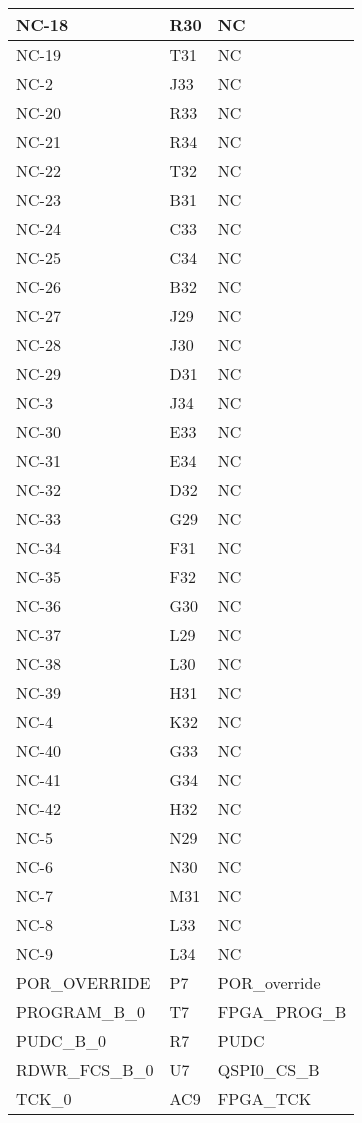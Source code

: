\begin{footnotesize}
\begin{longtable}{|p{7cm}|p{1cm}|p{5cm}|}
NC-18	&	R30	&	NC	\\ \hline
NC-19	&	T31	&	NC	\\ \hline
NC-2	&	J33	&	NC	\\ \hline
NC-20	&	R33	&	NC	\\ \hline
NC-21	&	R34	&	NC	\\ \hline
NC-22	&	T32	&	NC	\\ \hline
NC-23	&	B31	&	NC	\\ \hline
NC-24	&	C33	&	NC	\\ \hline
NC-25	&	C34	&	NC	\\ \hline
NC-26	&	B32	&	NC	\\ \hline
NC-27	&	J29	&	NC	\\ \hline
NC-28	&	J30	&	NC	\\ \hline
NC-29	&	D31	&	NC	\\ \hline
NC-3	&	J34	&	NC	\\ \hline
NC-30	&	E33	&	NC	\\ \hline
NC-31	&	E34	&	NC	\\ \hline
NC-32	&	D32	&	NC	\\ \hline
NC-33	&	G29	&	NC	\\ \hline
NC-34	&	F31	&	NC	\\ \hline
NC-35	&	F32	&	NC	\\ \hline
NC-36	&	G30	&	NC	\\ \hline
NC-37	&	L29	&	NC	\\ \hline
NC-38	&	L30	&	NC	\\ \hline
NC-39	&	H31	&	NC	\\ \hline
NC-4	&	K32	&	NC	\\ \hline
NC-40	&	G33	&	NC	\\ \hline
NC-41	&	G34	&	NC	\\ \hline
NC-42	&	H32	&	NC	\\ \hline
NC-5	&	N29	&	NC	\\ \hline
NC-6	&	N30	&	NC	\\ \hline
NC-7	&	M31	&	NC	\\ \hline
NC-8	&	L33	&	NC	\\ \hline
NC-9	&	L34	&	NC	\\ \hline
POR\_OVERRIDE	&	P7	&	POR\_override	\\ \hline
PROGRAM\_B\_0	&	T7	&	FPGA\_PROG\_B	\\ \hline
PUDC\_B\_0	&	R7	&	PUDC	\\ \hline
RDWR\_FCS\_B\_0	&	U7	&	QSPI0\_CS\_B	\\ \hline
TCK\_0	&	AC9	&	FPGA\_TCK	\\ \hline

\end{longtable}
\end{footnotesize}
